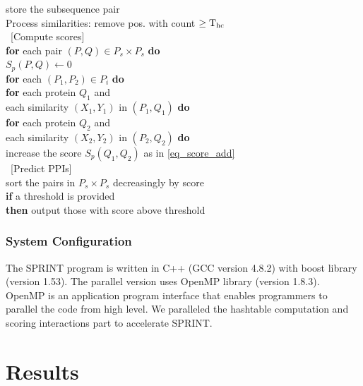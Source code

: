 \ccc  \qqf {} store the subsequence pair \\
\ccc Process similarities: remove pos. with count $\ge\operatorname{T_{\rm hc}}$ \\
\   [Compute scores]   \\
\ccc  \textbf{for} each pair $(P,Q) \in P_s\times P_s$ \textbf{do}\\
\ccc  \qqa $S_p(P,Q) \gets 0$\\
\ccc  \textbf{for} each $(P_1,P_2)\in P_i$ \textbf{do}   \\
\ccc  \qqa \textbf{for} each protein $Q_1$ and \\
\qqd each similarity $(X_1,Y_1)$ in $(P_1,Q_1)$ \textbf{do}   \\
\ccc  \qqb \textbf{for} each protein $Q_2$ and \\
\qqe each similarity $(X_2,Y_2)$ in $(P_2,Q_2)$ \textbf{do}   \\
\ccc  \qqc increase the score $S_p(Q_1,Q_2)$ as in \eqref{eq_score_add}   \\
\   [Predict PPIs]\\
\ccc  sort the pairs in $P_s\times P_s$ decreasingly by score   \\
\ccc  \textbf{if} a threshold is provided  \\
\ccc  \qqa \textbf{then} output those with score above threshold   \\






\subsubsection{System Configuration}
The SPRINT program is written in C++ (GCC version 4.8.2) with boost library (version 1.53). The parallel version uses OpenMP library (version 1.8.3). OpenMP is an application program interface that enables programmers to parallel the code from high level. We paralleled the hashtable computation and scoring interactions part to accelerate SPRINT.

\section{Results}
